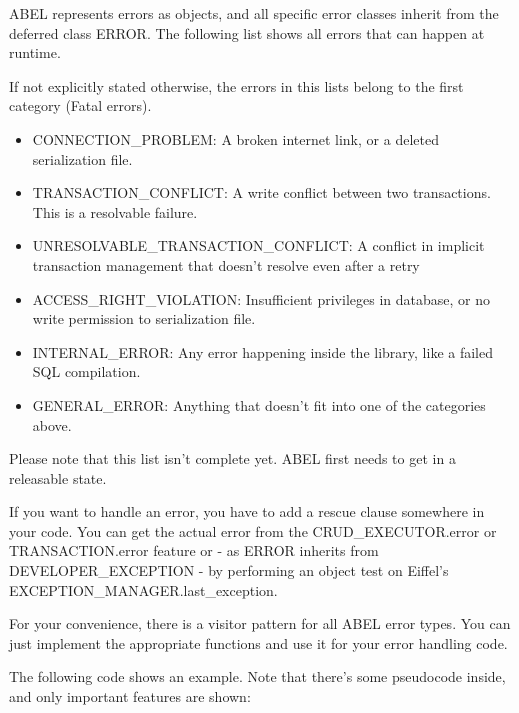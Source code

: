 ABEL represents errors as objects, and all specific error classes inherit from the deferred class ERROR.
The following list shows all errors that can happen at runtime.

If not explicitly stated otherwise, the errors in this lists belong to the first category (Fatal errors).

\begin{itemize}
\item CONNECTION\_PROBLEM: A broken internet link, or a deleted serialization file.
\item TRANSACTION\_CONFLICT: A write conflict between two transactions. This is a resolvable failure.
\item UNRESOLVABLE\_TRANSACTION\_CONFLICT: A conflict in implicit transaction management that doesn't resolve even after a retry
\item ACCESS\_RIGHT\_VIOLATION: Insufficient privileges in database, or no write permission to serialization file.
\item INTERNAL\_ERROR: Any error happening inside the library, like a failed SQL compilation.
\item GENERAL\_ERROR: Anything that doesn't fit into one of the categories above.
\end{itemize}

Please note that this list isn't complete yet. ABEL first needs to get in a releasable state.

If you want to handle an error, you have to add a rescue clause somewhere in your code. 
You can get the actual error from the CRUD\_EXECU\-TOR.error or TRANSACTION.error feature or - as ERROR inherits from DEVELOPER\_EXCEPTION -
by performing an object test on Eiffel's EXCEPTION\_MANAGER.last\_exception.

For your convenience, there is a visitor pattern for all ABEL error types. 
You can just implement the appropriate functions and use it for your error handling code.

The following code shows an example. 
Note that there's some pseudocode inside, and only important features are shown:

